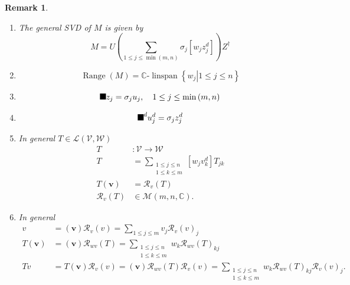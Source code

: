 \documentclass[aps,preprint]{revtex4}%
\providecommand{\U}[1]{\protect\rule{.1in}{.1in}}
\newtheorem{remark}[theorem]{Remark}
\begin{document}
\begin{remark}
\begin{enumerate}
\item The general SVD of $M$ is given by
\begin{equation}
M=U\left(  \sum_{1\leq j\leq\min\left(  m,n\right)  }\sigma_{j}\left[
w_{j}z_{j}^{d}\right]  \right)  Z^{\dagger}%
\end{equation}


\item
\begin{equation}
\operatorname*{Range}\left(  M\right)  =\mathbb{C}\text{-}%
\operatorname*{linspan}\left\{  \left.  w_{j}\right\vert 1\leq j\leq
n\right\}
\end{equation}


\item
\begin{equation}
\U{3a3} z_{j}=\sigma_{j}u_{j},\quad1\leq j\leq\min\left(  m,n\right)
\end{equation}


\item
\begin{equation}
\U{3a3} ^{d}u_{j}^{d}=\sigma_{j}z_{j}^{d}%
\end{equation}


\item In general $T\in\mathcal{L}\left(  \mathcal{V},\mathcal{W}\right)  $
\begin{align}
T  &  :\mathcal{V}\rightarrow\mathcal{W}\\
T  &  =\sum_{\substack{1\leq j\leq n\\1\leq k\leq m}}\left[  w_{j}v_{k}%
^{d}\right]  T_{jk}\\
T\left(  \boldsymbol{v}\right)   &  =\mathcal{R}_{v}\left(  T\right) \\
\mathcal{R}_{v}\left(  T\right)   &  \in\mathcal{M}\left(  m,n,\mathbb{C}%
\right)  .
\end{align}


\item In general%
\begin{align}
v  &  =\left(  \boldsymbol{v}\right)  \mathcal{R}_{v}\left(  v\right)
=\sum_{1\leq j\leq m}v_{j}\mathcal{R}_{v}\left(  v\right)  _{j}\\
T\left(  \boldsymbol{v}\right)   &  =\left(  \boldsymbol{v}\right)
\mathcal{R}_{wv}\left(  T\right)  =\sum_{\substack{1\leq j\leq n\\1\leq k\leq
m}}w_{k}\mathcal{R}_{wv}\left(  T\right)  _{kj}\\
Tv  &  =T\left(  \boldsymbol{v}\right)  \mathcal{R}_{v}\left(  v\right)
=\left(  \mathbf{v}\right)  \mathcal{R}_{wv}\left(  T\right)  \mathcal{R}%
_{v}\left(  v\right)  =\sum_{\substack{1\leq j\leq n\\1\leq k\leq m}%
}w_{k}\mathcal{R}_{wv}\left(  T\right)  _{kj}\mathcal{R}_{v}\left(  v\right)
_{j}.
\end{align}



\end{enumerate}
\end{remark}
\end{document}
